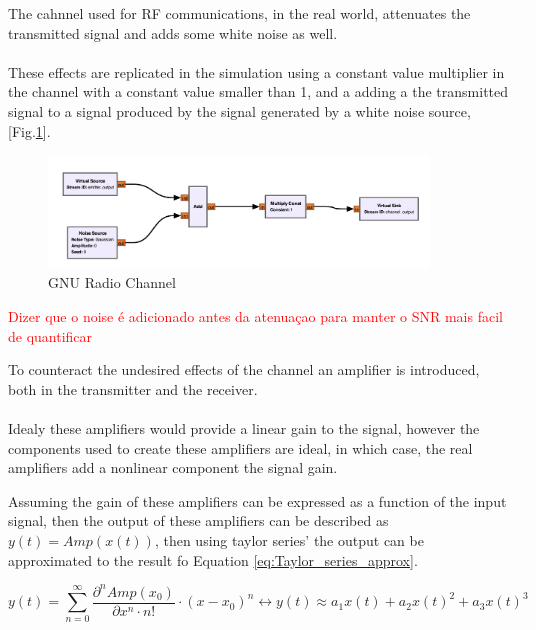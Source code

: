 The cahnnel used for RF communications, in the real world, attenuates the transmitted signal 
and adds some white noise as well. 

\paragraph{}
These effects are replicated in the simulation using a constant value multiplier in 
the channel with a constant value smaller than 1, and a adding a the transmitted signal to 
a signal produced by the signal generated by a white noise source, [Fig.\ref{fig:Gnu_Channel}].

\begin{figure}[H]
    \centering
    \includegraphics*[width=0.9\textwidth]{Images/GNU_Channel.png}
    \caption{GNU Radio Channel}
    \label{fig:Gnu_Channel}
\end{figure}
\textcolor{red}{Dizer que o noise é adicionado antes da atenuaçao para manter o SNR mais facil de quantificar}

To counteract the undesired effects of the channel an amplifier is introduced, both 
in the transmitter and the receiver.

\paragraph{}
Idealy these amplifiers would provide a linear gain to the signal, however the components 
used to create these amplifiers are ideal, in which case, the real amplifiers add a nonlinear 
component the signal gain.

Assuming the gain of these amplifiers can be expressed as a function of the input signal, 
then the output of these amplifiers can be described as \(y(t) = Amp(x(t))\), then using 
taylor series' the output can be approximated to the result fo Equation \ref{eq:Taylor_series_approx}.

\begin{equation}
    y(t) = \sum_{n=0}^{\infty} \frac{\partial^n Amp(x_0)}{\partial x^n \cdot n!} \cdot (x - x_0)^n \leftrightarrow y(t) \approx a_1x(t) + a_2{x(t)}^2 + a_3{x(t)}^3
    \label{eq:Taylor_series_approx}
\end{equation}

